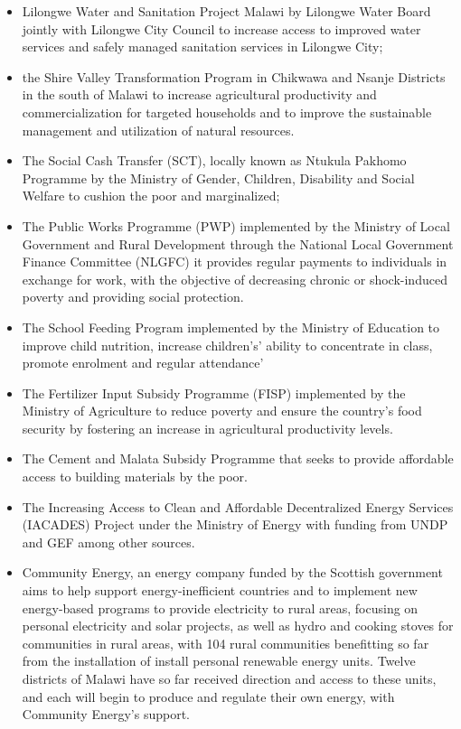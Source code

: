 \documentclass[
]{book}
\begin{document}
\begin{itemize}
\item
  Lilongwe Water and Sanitation Project Malawi by Lilongwe Water Board jointly with Lilongwe City Council to increase access to improved water services and
  safely managed sanitation services in Lilongwe City;
\item
  the Shire Valley Transformation Program in Chikwawa and Nsanje Districts in the south of Malawi to increase agricultural productivity and commercialization for
  targeted households and to improve the sustainable management and utilization of natural resources.
\item
  The Social Cash Transfer (SCT), locally known as Ntukula Pakhomo Programme by the Ministry of Gender, Children, Disability and Social Welfare to cushion the
  poor and marginalized;
\item
  The Public Works Programme (PWP) implemented by the Ministry of Local Government and Rural Development through the National Local Government Finance Committee
  (NLGFC) it provides regular payments to individuals in exchange for work, with the objective of decreasing chronic or shock-induced poverty and providing
  social protection.
\item
  The School Feeding Program implemented by the Ministry of Education to improve child nutrition, increase children's' ability to concentrate in class, promote
  enrolment and regular attendance'
\item
  The Fertilizer Input Subsidy Programme (FISP) implemented by the Ministry of Agriculture to reduce poverty and ensure the country's food security by fostering
  an increase in agricultural productivity levels.
\item
  The Cement and Malata Subsidy Programme that seeks to provide affordable access to building materials by the poor.
\item
  The Increasing Access to Clean and Affordable Decentralized Energy Services (IACADES) Project under the Ministry of Energy with funding from UNDP and GEF among
  other sources.
\item
  Community Energy, an energy company funded by the Scottish government aims to help support energy-inefficient countries and to implement new energy-based
  programs to provide electricity to rural areas, focusing on personal electricity and solar projects, as well as hydro and cooking stoves for communities in
  rural areas, with 104 rural communities benefitting so far from the installation of install personal renewable energy units. Twelve districts of Malawi have so
  far received direction and access to these units, and each will begin to produce and regulate their own energy, with Community Energy's support.
\end{itemize}
\end{document}
